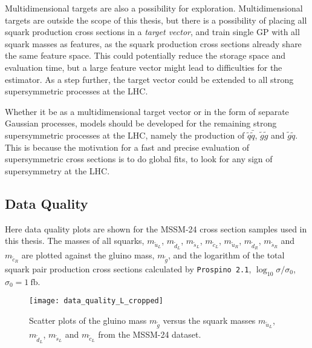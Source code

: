 \documentclass[twoside,english]{uiofysmaster}
\begin{document}
{{Multidimensional targets are also a possibility for exploration. Multidimensional targets are outside the scope of this thesis, but there is a possibility of placing all squark production cross sections in a \textit{target vector}, and train single GP with all squark masses as features, as the squark production cross sections already share the same feature space. This could potentially reduce the storage space and evaluation time, but a large feature vector might lead to difficulties for the estimator. As a step further, the target vector could be extended to all strong supersymmetric processes at the LHC. 

Whether it be as a multidimensional target vector or in the form of separate Gaussian processes, models should be developed for the remaining strong supersymmetric processes at the LHC, namely the production of $\tilde{q} \bar{\tilde{q}}$, $\tilde{g} \tilde{g}$ and $\tilde{g} \tilde{q}$. This is because the motivation for a fast and precise evaluation of supersymmetric cross sections is to do global fits, to look for any sign of supersymmetry at the LHC. 



\begin{appendices}



\chapter{Data Quality}\label{App: Quality Plots}



Here data quality plots are shown for the MSSM-24 cross section samples used in this thesis. The masses of all squarks, $m_{\widetilde{u}_L}$, $m_{\widetilde{d}_L}$, $m_{\widetilde{s}_L}$, $m_{\widetilde{c}_L}$, $m_{\widetilde{u}_R}$, $m_{\widetilde{d}_R}$, $m_{\widetilde{s}_R}$ and $m_{\widetilde{c}_R}$ are plotted against the gluino mass, $m_{\tilde{g}}$, and the logarithm of the total squark pair production cross sections calculated by \verb|Prospino 2.1|, $\log_{10} \sigma / \sigma_0$, $\sigma_0 = 1~\mathrm{fb}$.


\begin{figure}[H]
    \centering
        \texttt{[image: data\_quality\_L\_cropped]}
    \caption[Data quality $m_{\tilde{g}}$ versus $m_{\widetilde{u}_L}$, $m_{\widetilde{d}_L}$, $m_{\widetilde{s}_L}$ and $m_{\widetilde{c}_L}$]{Scatter plots of the gluino mass $m_{\tilde{g}}$ versus the squark masses $m_{\widetilde{u}_L}$, $m_{\widetilde{d}_L}$, $m_{\widetilde{s}_L}$ and $m_{\widetilde{c}_L}$ from the MSSM-24 dataset.}
\label{Fig:: App : Data quality plots}
\end{figure}


\end{appendices}}}
\end{document}
